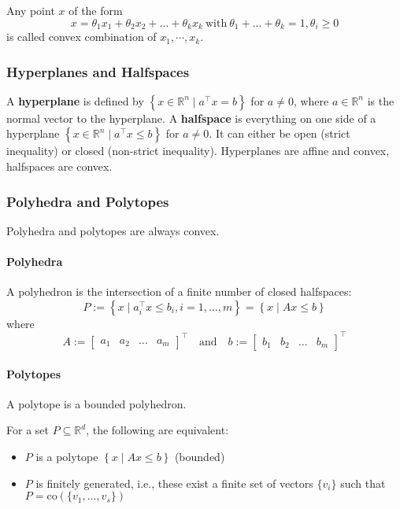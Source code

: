 Any point $x$ of the form
\begin{equation*}
    x=\theta_1x_1+\theta_2x_2+...+\theta_k x_k\mathrm{~with~}\theta_1+...+\theta_k=1,\theta_i\geq0
\end{equation*}
is called convex combination of $x_1,\cdots,x_k$.
\subsubsection{Hyperplanes and Halfspaces}
A \textbf{hyperplane} is defined by $\left\{x \in \mathbb{R}^n \mid a^\top x = b\right\}$ for $a \neq 0$, where $a \in \mathbb{R}^n$ is the normal vector to the hyperplane.
\newpar{}
A \textbf{halfspace} is everything on one side of a hyperplane $\left\{x \in \mathbb{R}^n \mid a^\top x \leq b\right\}$ for $a \neq 0$. It can either be open (strict inequality) or closed (non-strict inequality).
\newpar{}
Hyperplanes are affine and convex, halfspaces are convex. %

\subsubsection{Polyhedra and Polytopes}
Polyhedra and polytopes are always convex. %
\paragraph{Polyhedra}
A polyhedron is the intersection of a finite number of closed halfspaces:
\begin{equation*}
    P := \left\{ x \mid a_i^\top x \leq b_i, i = 1, \ldots, m \right\} = \left\{ x \mid Ax \leq b \right\}
\end{equation*}
where
\begin{equation*}
    A := \begin{bmatrix} a_1 & a_2 & \ldots & a_m \end{bmatrix}^\top \quad \text{and} \quad b := \begin{bmatrix} b_1 & b_2 & \ldots & b_m \end{bmatrix}^\top
\end{equation*}
\paragraph{Polytopes}
A polytope is a bounded polyhedron.
\newpar{}

For a set $P\subseteq \mathbb{R}^d$, the following are equivalent:
\begin{itemize}
    \item $P$ is a polytope $\left\{ x \mid Ax \leq b \right\}$ (bounded)
    \item $P$ is finitely generated, i.e., these exist a finite set of vectors $\{v_i\}$ such that $P=\mathrm{co}(\{v_1, \dots, v_s\})$
\end{itemize}

